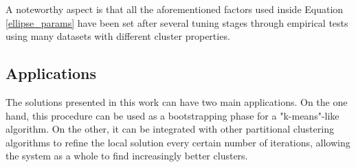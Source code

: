 A noteworthy aspect is that all the aforementioned factors used inside Equation \ref{ellipse_params} have
been set after several tuning stages through empirical tests using many datasets with different
cluster properties.


\subsection*{Applications}
The solutions presented in this work can have two main applications. On the one hand,
this procedure can be used as a bootstrapping phase for a  "k-means"-like algorithm. 
On the other, it can be integrated with other partitional clustering algorithms to
refine the local solution every certain number of iterations, allowing the system as a
whole to find increasingly better clusters.